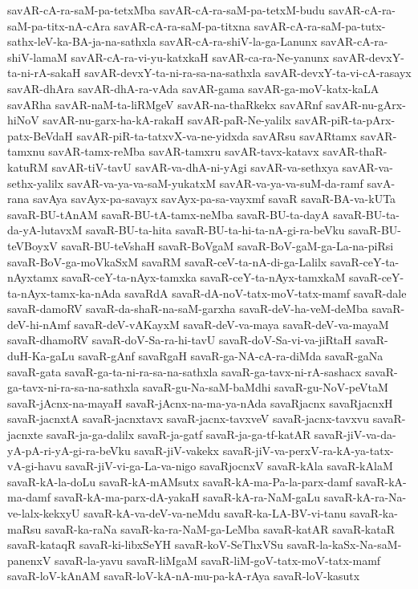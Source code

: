 {savAR-cA-ra-saM-pa-tetxMba
savAR-cA-ra-saM-pa-tetxM-budu
savAR-cA-ra-saM-pa-titx-nA-cAra
savAR-cA-ra-saM-pa-titxna
savAR-cA-ra-saM-pa-tutx-sathx-leV-ka-BA-ja-na-sathxla
savAR-cA-ra-shiV-la-ga-Lanunx
savAR-cA-ra-shiV-lamaM
savAR-cA-ra-vi-yu-katxkaH
savAR-ca-ra-Ne-yanunx
savAR-devxY-ta-ni-rA-sakaH
savAR-devxY-ta-ni-ra-sa-na-sathxla
savAR-devxY-ta-vi-cA-rasayx
savAR-dhAra
savAR-dhA-ra-vAda
savAR-gama
savAR-ga-moV-katx-kaLA
savARha
savAR-naM-ta-liRMgeV
savAR-na-thaRkekx
savARnf
savAR-nu-gArx-hiNoV
savAR-nu-garx-ha-kA-rakaH
savAR-paR-Ne-yalilx
savAR-piR-ta-pArx-patx-BeVdaH
savAR-piR-ta-tatxvX-va-ne-yidxda
savARsu
savARtamx
savAR-tamxnu
savAR-tamx-reMba
savAR-tamxru
savAR-tavx-katavx
savAR-thaR-katuRM
savAR-tiV-tavU
savAR-va-dhA-ni-yAgi
savAR-va-sethxya
savAR-va-sethx-yalilx
savAR-va-ya-va-saM-yukatxM
savAR-va-ya-va-suM-da-ramf
savA-rana
savAya
savAyx-pa-savayx
savAyx-pa-sa-vayxmf
savaR
savaR-BA-va-kUTa
savaR-BU-tAnAM
savaR-BU-tA-tamx-neMba
savaR-BU-ta-dayA
savaR-BU-ta-da-yA-lutavxM
savaR-BU-ta-hita
savaR-BU-ta-hi-ta-nA-gi-ra-beVku
savaR-BU-teVBoyxV
savaR-BU-teVshaH
savaR-BoVgaM
savaR-BoV-gaM-ga-La-na-piRsi
savaR-BoV-ga-moVkaSxM
savaRM
savaR-ceV-ta-nA-di-ga-Lalilx
savaR-ceY-ta-nAyxtamx
savaR-ceY-ta-nAyx-tamxka
savaR-ceY-ta-nAyx-tamxkaM
savaR-ceY-ta-nAyx-tamx-ka-nAda
savaRdA
savaR-dA-noV-tatx-moV-tatx-mamf
savaR-dale
savaR-damoRV
savaR-da-shaR-na-saM-garxha
savaR-deV-ha-veM-deMba
savaR-deV-hi-nAmf
savaR-deV-vAKayxM
savaR-deV-va-maya
savaR-deV-va-mayaM
savaR-dhamoRV
savaR-doV-Sa-ra-hi-tavU
savaR-doV-Sa-vi-va-jiRtaH
savaR-duH-Ka-gaLu
savaR-gAnf
savaRgaH
savaR-ga-NA-cA-ra-diMda
savaR-gaNa
savaR-gata
savaR-ga-ta-ni-ra-sa-na-sathxla
savaR-ga-tavx-ni-rA-sashacx
savaR-ga-tavx-ni-ra-sa-na-sathxla
savaR-gu-Na-saM-baMdhi
savaR-gu-NoV-peVtaM
savaR-jAcnx-na-mayaH
savaR-jAcnx-na-ma-ya-nAda
savaRjacnx
savaRjacnxH
savaR-jacnxtA
savaR-jacnxtavx
savaR-jacnx-tavxveV
savaR-jacnx-tavxvu
savaR-jacnxte
savaR-ja-ga-dalilx
savaR-ja-gatf
savaR-ja-ga-tf-katAR
savaR-jiV-va-da-yA-pA-ri-yA-gi-ra-beVku
savaR-jiV-vakekx
savaR-jiV-va-perxV-ra-kA-ya-tatx-vA-gi-havu
savaR-jiV-vi-ga-La-va-nigo
savaRjocnxV
savaR-kAla
savaR-kAlaM
savaR-kA-la-doLu
savaR-kA-mAMsutx
savaR-kA-ma-Pa-la-parx-damf
savaR-kA-ma-damf
savaR-kA-ma-parx-dA-yakaH
savaR-kA-ra-NaM-gaLu
savaR-kA-ra-Na-ve-lalx-kekxyU
savaR-kA-va-deV-va-neMdu
savaR-ka-LA-BV-vi-tanu
savaR-ka-maRsu
savaR-ka-raNa
savaR-ka-ra-NaM-ga-LeMba
savaR-katAR
savaR-kataR
savaR-kataqR
savaR-ki-libxSeYH
savaR-koV-SeThxVSu
savaR-la-kaSx-Na-saM-panenxV
savaR-la-yavu
savaR-liMgaM
savaR-liM-goV-tatx-moV-tatx-mamf
savaR-loV-kAnAM
savaR-loV-kA-nA-mu-pa-kA-rAya
savaR-loV-kasutx
}
